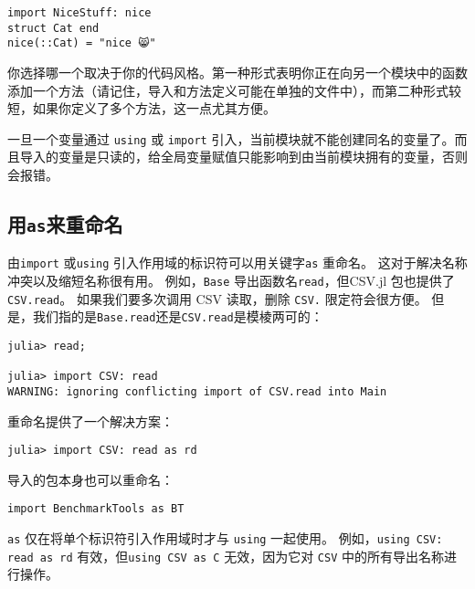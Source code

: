 \begin{verbatim}
import NiceStuff: nice
struct Cat end
nice(::Cat) = "nice 😸"
\end{verbatim}



你选择哪一个取决于你的代码风格。第一种形式表明你正在向另一个模块中的函数添加一个方法（请记住，导入和方法定义可能在单独的文件中），而第二种形式较短，如果你定义了多个方法，这一点尤其方便。



一旦一个变量通过 \texttt{using} 或 \texttt{import} 引入，当前模块就不能创建同名的变量了。而且导入的变量是只读的，给全局变量赋值只能影响到由当前模块拥有的变量，否则会报错。



\hypertarget{18154480065808854921}{}


\subsection{用\texttt{as}来重命名}



由\texttt{import} 或\texttt{using} 引入作用域的标识符可以用关键字\texttt{as} 重命名。 这对于解决名称冲突以及缩短名称很有用。 例如，\texttt{Base} 导出函数名\texttt{read}，但CSV.jl 包也提供了\texttt{CSV.read}。 如果我们要多次调用 CSV 读取，删除 \texttt{CSV.} 限定符会很方便。 但是，我们指的是\texttt{Base.read}还是\texttt{CSV.read}是模棱两可的：




\begin{verbatim}
julia> read;

julia> import CSV: read
WARNING: ignoring conflicting import of CSV.read into Main
\end{verbatim}



重命名提供了一个解决方案：




\begin{verbatim}
julia> import CSV: read as rd
\end{verbatim}



导入的包本身也可以重命名：




\begin{verbatim}
import BenchmarkTools as BT
\end{verbatim}



\texttt{as} 仅在将单个标识符引入作用域时才与 \texttt{using} 一起使用。 例如，\texttt{using CSV: read as rd} 有效，但\texttt{using CSV as C} 无效，因为它对 \texttt{CSV} 中的所有导出名称进行操作。



